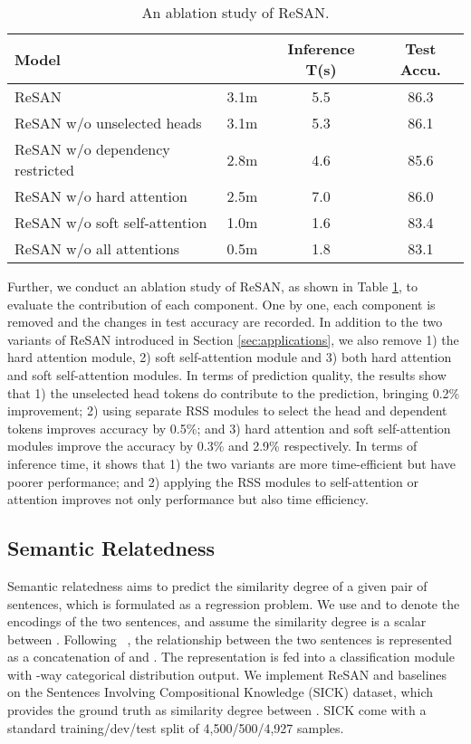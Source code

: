 \documentclass{article}
\begin{document}
\begin{table}[t] \small \centering
	\setlength{\tabcolsep}{1pt}
	\begin{tabular}{@{}lccc@{}}
		\toprule
		\textbf{Model}& \textbf{} & \textbf{Inference T(s)}& \textbf{Test Accu.}\\ \midrule
		ReSAN  &            3.1m&       5.5&        86.3\\
		ReSAN w/o unselected heads&            3.1m&        5.3&       86.1\\
		ReSAN w/o dependency restricted&           2.8m&          4.6&     85.6\\
		ReSAN w/o hard attention  &            2.5m&       7.0&        86.0\\
		ReSAN w/o soft self-attention &            1.0m&       1.6&        83.4\\
		ReSAN w/o all attentions & 0.5m&     1.8&       83.1\\ \bottomrule
	\end{tabular}
	\caption{\small An ablation study of ReSAN.}
	\label{table:exps_snli_ablation}	
\end{table}

Further, we conduct an ablation study of ReSAN, as shown in Table \ref{table:exps_snli_ablation}, to evaluate the contribution of each component. One by one, each component is removed and the changes in test accuracy are recorded.  In addition to the two variants of ReSAN introduced in Section \ref{sec:applications}, we also remove 1) the hard attention module, 2) soft self-attention module and 3) both hard attention and soft self-attention modules. In terms of prediction quality, the results show that 1) the unselected head tokens do contribute to the prediction, bringing 0.2\% improvement; 2) using separate RSS modules to select the head and dependent tokens improves accuracy by 0.5\%; and 3) hard attention and soft self-attention modules improve the accuracy by 0.3\% and 2.9\% respectively. In terms of inference time, it shows that 1) the two variants are more time-efficient but have poorer performance; and 2) applying the RSS modules to self-attention or attention improves not only performance but also time efficiency.

\subsection{Semantic Relatedness} \label{sec:semantic_relatedness}

Semantic relatedness aims to predict the similarity degree of a given pair of sentences, which is formulated as a regression problem. We use  and  to denote the encodings of the two sentences, and assume the similarity degree is a scalar between . Following  \citeauthor{tai2015improved}~, the relationship between the two sentences is represented as a concatenation of  and . The representation is fed into a classification module with -way categorical distribution output. We implement ReSAN and baselines on the Sentences Involving Compositional Knowledge \cite{marelli2014sick} (SICK) dataset, which provides the ground truth as similarity degree between . SICK come with a standard training/dev/test split of 4,500/500/4,927 samples. 
\end{document}
